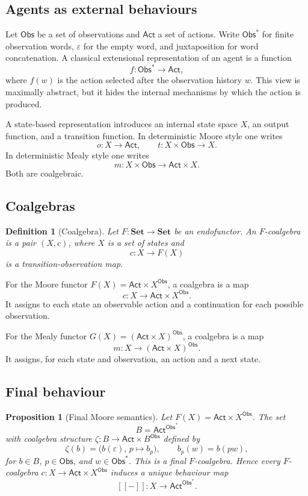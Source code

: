\documentclass[a4paper,fleqn]{cas-sc}
\newtheorem{definition}{Definition}
\newtheorem{proposition}{Proposition}
\newcommand{\Set}{\mathbf{Set}}
\newcommand{\sem}[1]{\left[\!\left[#1\right]\!\right]}
\newcommand{\Obs}{\mathsf{Obs}}
\newcommand{\Act}{\mathsf{Act}}
\begin{document}
\subsection{Agents as external behaviours}

Let \(\Obs\) be a set of observations and \(\Act\) a set of actions. Write
\(\Obs^{*}\) for finite observation words, \(\varepsilon\) for the empty
word, and juxtaposition for word concatenation. A classical extensional
representation of an agent is a function
\[
  f:\Obs^{*}\to\Act,
\]
where \(f(w)\) is the action selected after the observation history \(w\). This view is maximally abstract, but it hides the internal mechanisms by which the action is produced.

A state-based representation introduces an internal state space \(X\), an output function, and a transition function. In deterministic Moore style one writes
\[
  o:X\to\Act,
  \qquad
  t:X\times\Obs\to X.
\]
In deterministic Mealy style one writes
\[
  m:X\times\Obs\to \Act\times X.
\]
Both are coalgebraic.

\subsection{Coalgebras}

\begin{definition}[Coalgebra]
Let \(F:\Set\to\Set\) be an endofunctor. An \(F\)-coalgebra is a pair \((X,c)\), where \(X\) is a set of states and
\[
  c:X\to F(X)
\]
is a transition-observation map.
\end{definition}

For the Moore functor \(F(X)=\Act\times X^{\Obs}\), a coalgebra is a map
\[
  c:X\to\Act\times X^{\Obs}.
\]
It assigns to each state an observable action and a continuation for each possible observation.

For the Mealy functor \(G(X)=(\Act\times X)^{\Obs}\), a coalgebra is a map
\[
  m:X\to(\Act\times X)^{\Obs}.
\]
It assigns, for each state and observation, an action and a next state.

\subsection{Final behaviour}

\begin{proposition}[Final Moore semantics]\label{prop:final-moore-semantics}
Let \(F(X)=\Act\times X^{\Obs}\). The set
\[
  B=\Act^{\Obs^{*}}
\]
with coalgebra structure \(\zeta:B\to\Act\times B^{\Obs}\) defined by
\[
  \zeta(b)=\bigl(b(\varepsilon),\,p\mapsto b_p\bigr),
  \qquad
  b_p(w)=b(pw),
\]
for \(b\in B\), \(p\in\Obs\), and \(w\in\Obs^*\). This is a final
\(F\)-coalgebra. Hence every \(F\)-coalgebra
\(c:X\to\Act\times X^{\Obs}\) induces a unique behaviour map
\[
  \sem{-}:X\to\Act^{\Obs^{*}}.
\]
\end{proposition}
\end{document}

